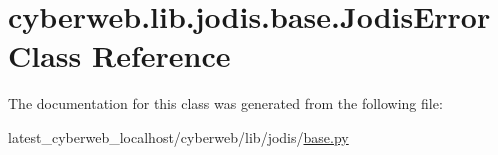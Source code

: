 \hypertarget{classcyberweb_1_1lib_1_1jodis_1_1base_1_1_jodis_error}{\section{cyberweb.\-lib.\-jodis.\-base.\-Jodis\-Error \-Class \-Reference}
\label{classcyberweb_1_1lib_1_1jodis_1_1base_1_1_jodis_error}
}


\-The documentation for this class was generated from the following file\-:\begin{DoxyCompactItemize}
\item 
latest\-\_\-cyberweb\-\_\-localhost/cyberweb/lib/jodis/\hyperlink{jodis_2base_8py}{base.\-py}\end{DoxyCompactItemize}
